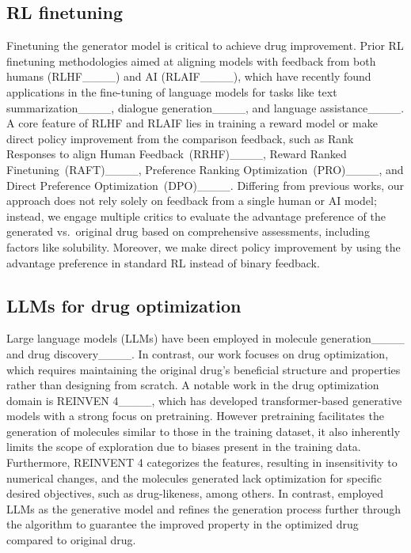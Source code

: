 \subsection{RL finetuning}
{Finetuning the generator model is critical to achieve drug improvement.
Prior RL finetuning methodologies aimed at aligning models with feedback from both humans (RLHF____) and AI (RLAIF____), which have recently found applications in the fine-tuning of language models for tasks like text summarization____, dialogue generation____, 
and language assistance____. 
A core feature of RLHF and RLAIF lies in training a reward model {or make direct policy improvement} from the comparison feedback, {such as Rank Responses to align Human Feedback~(RRHF)____, Reward Ranked Finetuning~(RAFT)____, Preference Ranking Optimization~(PRO)____, and Direct Preference Optimization~(DPO)____.}}
Differing from previous works, our approach does not rely solely on feedback from a single human or AI model; instead, we engage multiple critics to evaluate the advantage preference of the generated vs.\ original drug based on comprehensive assessments, including factors like solubility. 
Moreover, we make direct policy improvement by using the advantage preference {in standard RL} {instead of binary feedback}.

























\subsection{{LLMs for drug optimization}}


Large language models (LLMs) have been employed in molecule generation____ and drug discovery____. In contrast, our work focuses on drug optimization, which requires maintaining the original drug's beneficial structure and properties rather than designing from scratch.
A notable work in the drug optimization domain is REINVEN 4____, which has developed transformer-based generative models with a strong focus on pretraining. However pretraining facilitates the generation of molecules similar to those in the training dataset, it also inherently limits the scope of exploration due to biases present in the training data. {Furthermore, REINVENT 4 categorizes the features, resulting in insensitivity to numerical changes, and the molecules generated lack optimization for specific desired objectives, such as drug-likeness, among others.}
In contrast, {\fwname} employed LLMs as the generative model and refines the generation process further through the \algname algorithm to guarantee the improved property in the optimized drug compared to original drug.